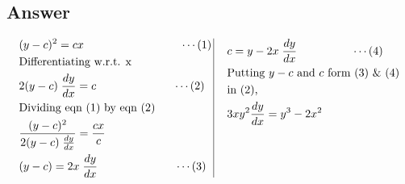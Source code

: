 \documentclass[17pt]{extarticle}
\begin{document}
\begin{fleqn}
\subsection*{Answer}
\begin{equation} \nonumber
\begin{alignedat}{4}
&  (y-c)^2 = cx  \hspace{3cm} \cdots (1)  \\
& \text{Differentiating w.r.t. x \ }\\
&  2(y-c)\; \frac{dy}{dx}= c  \hspace{2.4cm} \cdots (2)\;\\
& \text{Dividing eqn (1) by eqn (2)}\\
& \frac{(y-c)^2}{2(y-c)\; \frac{dy}{dx}} =\frac{cx}{c} \\
& (y-c) = 2x\;\frac{dy}{dx} \hspace{2.4cm} \cdots (3)\\
\end{alignedat}
\,
\vrule
\quad
\, 
\begin{alignedat}{4}
& c = y - 2x\;\frac{dy}{dx} \hspace{1.7cm} \cdots (4)\\
& \text{Putting }y-c \text{ and }c \text{ form }(3) \text{ \& } (4)\\
& \text{in (2), }\\
& 3xy^2\frac{dy}{dx}=  y^3-2x^2\\& \\
& \\
& \\
\end{alignedat}
\end{equation}


\end{fleqn}
\end{document}
